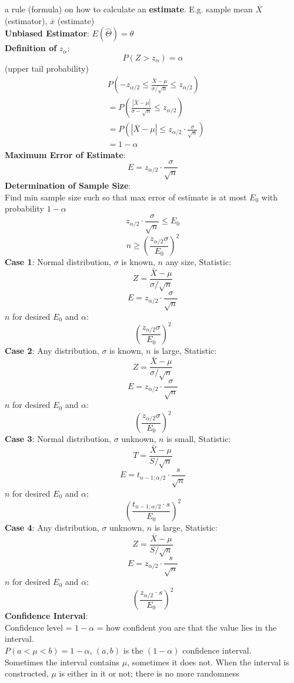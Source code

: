 \documentclass{article}
\begin{document}
\begin{multicols*}{3}
a rule (formula) on how to calculate an \textbf{estimate}. E.g. sample mean $\overline{X}$ (estimator), $\overline{x}$ (estimate) \\
\textbf{Unbiased Estimator}: $E(\hat\Theta)=\theta$\\
\textbf{Definition of} $z_\alpha$: 
$$P(Z>z_\alpha)=\alpha$$ (upper tail probability)
\begin{align*}
&P(-z_{\alpha/2}\leq\frac{\bar{X}-\mu}{\sigma/\sqrt{n}}\leq z_{\alpha/2})\\
&=P(\frac{|\bar{X}-\mu|}{\sigma-\sqrt{n}}\leq z_{\alpha/2})\\
&=P(|\bar{X}-\mu|\leq z_{\alpha/2}\cdot\frac{\sigma}{\sqrt{n}})\\
&=1-\alpha
\end{align*}
\textbf{Maximum Error of Estimate}: 
$$E=z_{\alpha/2}\cdot\frac{\sigma}{\sqrt{n}}$$
\textbf{Determination of Sample Size}:\\
Find min sample size such so that max error of estimate is at most $E_0$ with probability $1-\alpha$ \\
$$z_{\alpha/2}\cdot\frac{\sigma}{\sqrt{n}}\leq E_0$$
$$n\geq(\frac{z_{\alpha/2}\sigma}{E_0})^2$$
\textbf{Case 1}: Normal distribution, $\sigma$ is known, $n$ any size, Statistic: $$Z=\frac{\bar{X}-\mu}{\sigma/\sqrt{n}}$$
$$E=z_{\alpha/2}\cdot\frac{\sigma}{\sqrt{n}}$$
$n$ for desired $E_0$ and $\alpha$: $$(\frac{z_{\alpha/2}\sigma}{E_0})^2$$
\textbf{Case 2}: Any distribution, $\sigma$ is known, $n$ is large, Statistic: $$Z=\frac{\bar{X}-\mu}{\sigma/\sqrt{n}}$$
$$E=z_{\alpha/2}\cdot\frac{\sigma}{\sqrt{n}}$$
$n$ for desired $E_0$ and $\alpha$: $$(\frac{z_{\alpha/2}\sigma}{E_0})^2$$
\textbf{Case 3}: Normal distribution, $\sigma$ unknown, $n$ is small, Statistic: $$T=\frac{\bar{X}-\mu}{S/\sqrt{n}}$$
$$E=t_{n-1;\alpha/2}\cdot\frac{s}{\sqrt{n}}$$ 
$n$ for desired $E_0$ and $\alpha$: $$(\frac{t_{n-1;\alpha/2}\cdot s}{E_0})^2$$ 
\textbf{Case 4}: Any distribution, $\sigma$ unknown, $n$ is large, Statistic: $$Z=\frac{\bar{X}-\mu}{S/\sqrt{n}}$$ $$E=z_{\alpha/2}\cdot\frac{s}{\sqrt{n}}$$ 
$n$ for desired $E_0$ and $\alpha$: $$(\frac{z_{\alpha/2}\cdot s}{E_0})^2$$ 
\textbf{Confidence Interval}: \\
Confidence level = $1-\alpha$ = how confident you are that the value lies in the interval.\\
$P(a<\mu<b)=1-\alpha$, $(a,b)$ is the $(1-\alpha)$ confidence interval. \\
Sometimes the interval contains $\mu$, sometimes it does not. When the interval is constructed, $\mu$ is either in it or not; there is no more randomness\\

\end{multicols*}
\end{document}
